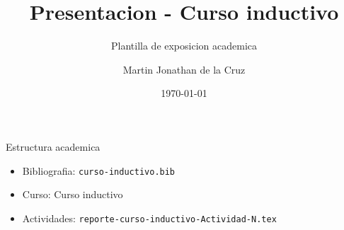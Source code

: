 \documentclass[spanish,aspectratio=169]{beamer}
\title{Presentacion - Curso inductivo}
\subtitle{Plantilla de exposicion academica}
\author{Martin Jonathan de la Cruz}
\institute{Universidad Ciudadana de Nuevo Leon}
\date{\today}
\begin{document}
\begin{frame}
  \titlepage
\end{frame}

\begin{frame}{Estructura academica}
  \begin{itemize}
    \item Bibliografia: \texttt{curso-inductivo.bib}
    \item Curso: Curso inductivo
    \item Actividades: \texttt{reporte-curso-inductivo-Actividad-N.tex}
  \end{itemize}
\end{frame}
\end{document}
